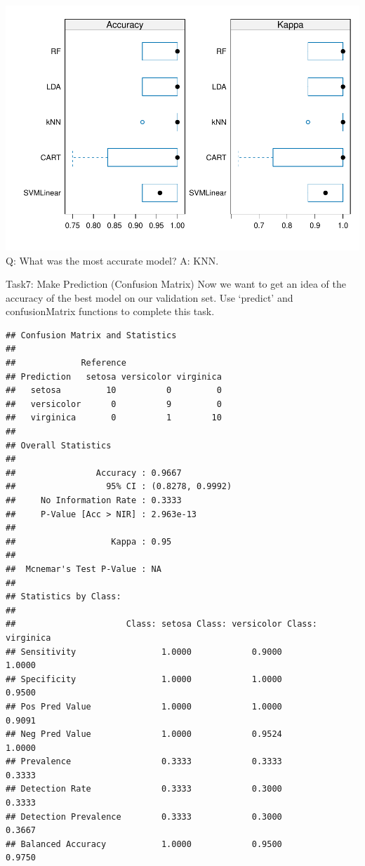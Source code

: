 \documentclass[
]{article}
\newenvironment{Shaded}{\begin{snugshade}}{\end{snugshade}}
\newcommand{\AttributeTok}[1]{\textcolor[rgb]{0.13,0.29,0.53}{#1}}
\newcommand{\FunctionTok}[1]{\textcolor[rgb]{0.13,0.29,0.53}{\textbf{#1}}}
\newcommand{\NormalTok}[1]{#1}
\newcommand{\OtherTok}[1]{\textcolor[rgb]{0.56,0.35,0.01}{#1}}
\newcommand{\SpecialCharTok}[1]{\textcolor[rgb]{0.81,0.36,0.00}{\textbf{#1}}}
\begin{document}
\includegraphics{caret_lab_files/figure-latex/unnamed-chunk-12-1.pdf} Q:
What was the most accurate model? A: KNN.

Task7: Make Prediction (Confusion Matrix) Now we want to get an idea of
the accuracy of the best model on our validation set. Use `predict' and
confusionMatrix functions to complete this task.

\begin{Shaded}
\end{Shaded}

\begin{verbatim}
## Confusion Matrix and Statistics
## 
##             Reference
## Prediction   setosa versicolor virginica
##   setosa         10          0         0
##   versicolor      0          9         0
##   virginica       0          1        10
## 
## Overall Statistics
##                                           
##                Accuracy : 0.9667          
##                  95% CI : (0.8278, 0.9992)
##     No Information Rate : 0.3333          
##     P-Value [Acc > NIR] : 2.963e-13       
##                                           
##                   Kappa : 0.95            
##                                           
##  Mcnemar's Test P-Value : NA              
## 
## Statistics by Class:
## 
##                      Class: setosa Class: versicolor Class: virginica
## Sensitivity                 1.0000            0.9000           1.0000
## Specificity                 1.0000            1.0000           0.9500
## Pos Pred Value              1.0000            1.0000           0.9091
## Neg Pred Value              1.0000            0.9524           1.0000
## Prevalence                  0.3333            0.3333           0.3333
## Detection Rate              0.3333            0.3000           0.3333
## Detection Prevalence        0.3333            0.3000           0.3667
## Balanced Accuracy           1.0000            0.9500           0.9750
\end{verbatim}
\end{document}
